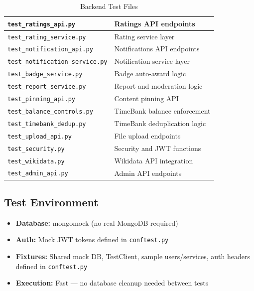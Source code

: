 \documentclass[10pt,a4paper]{report}
\begin{document}
\begin{table}[h]
\begin{tabular}{|l|l|}
        \hline
        \texttt{test\_ratings\_api.py}         & Ratings API endpoints            \\
        \hline
        \texttt{test\_rating\_service.py}      & Rating service layer             \\
        \hline
        \texttt{test\_notification\_api.py}    & Notifications API endpoints      \\
        \hline
        \texttt{test\_notification\_service.py}& Notification service layer       \\
        \hline
        \texttt{test\_badge\_service.py}       & Badge auto-award logic           \\
        \hline
        \texttt{test\_report\_service.py}      & Report and moderation logic      \\
        \hline
        \texttt{test\_pinning\_api.py}         & Content pinning API              \\
        \hline
        \texttt{test\_balance\_controls.py}    & TimeBank balance enforcement     \\
        \hline
        \texttt{test\_timebank\_dedup.py}      & TimeBank deduplication logic     \\
        \hline
        \texttt{test\_upload\_api.py}          & File upload endpoints            \\
        \hline
        \texttt{test\_security.py}             & Security and JWT functions       \\
        \hline
        \texttt{test\_wikidata.py}             & Wikidata API integration         \\
        \hline
        \texttt{test\_admin\_api.py}           & Admin API endpoints              \\
        \hline
    \end{tabular}
    \caption{Backend Test Files}
\end{table}

\subsection{Test Environment}

\begin{itemize}
    \item \textbf{Database:} mongomock (no real MongoDB required)
    \item \textbf{Auth:} Mock JWT tokens defined in \texttt{conftest.py}
    \item \textbf{Fixtures:} Shared mock DB, TestClient, sample users/services, auth headers defined in \texttt{conftest.py}
    \item \textbf{Execution:} Fast --- no database cleanup needed between tests
\end{itemize}
\end{document}
